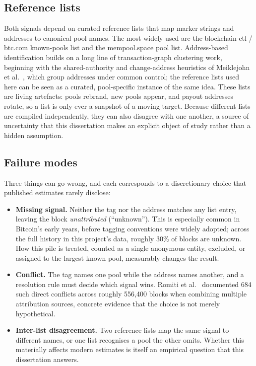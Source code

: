 \documentclass[logo,msc]{infthesis}           %
\begin{document}
\subsection{Reference lists}
 
Both signals depend on curated reference lists that map marker strings and
addresses to canonical pool names. The most widely used are the
blockchain-etl / btc.com known-pools list and the mempool.space pool list.
Address-based identification builds on a long line of transaction-graph
clustering work, beginning with the shared-authority and change-address
heuristics of Meiklejohn et al.~\cite{meiklejohn2013fistful}, which group
addresses under common control; the reference lists used here can be seen as a
curated, pool-specific instance of the same idea.
These lists are living artefacts: pools rebrand, new pools appear, and payout
addresses rotate, so a list is only ever a snapshot of a moving target. Because
different lists are compiled independently, they can also disagree with one
another, a source of uncertainty that this dissertation makes an explicit
object of study rather than a hidden assumption.
 
\subsection{Failure modes}
 
Three things can go wrong, and each corresponds to a discretionary choice that
published estimates rarely disclose:
 
\begin{itemize}
  \item \textbf{Missing signal.} Neither the tag nor the address matches any
    list entry, leaving the block \emph{unattributed} (``unknown''). This is
    especially common in Bitcoin's early years, before tagging conventions were
    widely adopted; across the full history in this project's data, roughly
    30\% of blocks are unknown. How this pile is treated, counted as a single
    anonymous entity, excluded, or assigned to the largest known pool,
    measurably changes the result.
  \item \textbf{Conflict.} The tag names one pool while the address names
    another, and a resolution rule must decide which signal wins. Romiti et
    al.~\cite{romiti2019deep} documented 684 such direct conflicts across
    roughly 556{,}400 blocks when combining multiple attribution sources,
    concrete evidence that the choice is not merely hypothetical.
  \item \textbf{Inter-list disagreement.} Two reference lists map the same
    signal to different names, or one list recognises a pool the other omits.
    Whether this materially affects modern estimates is itself an empirical
    question that this dissertation answers.
\end{itemize}
 
\end{document}
